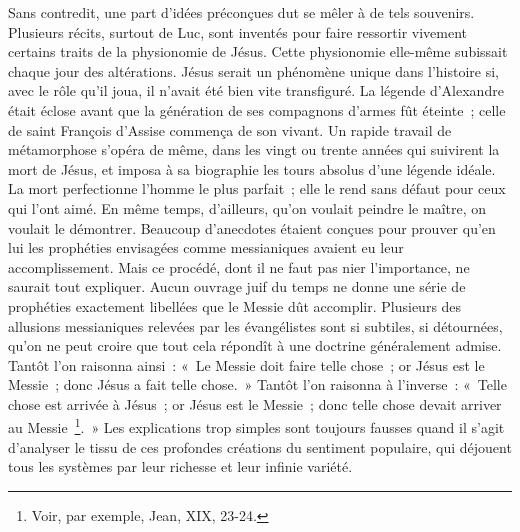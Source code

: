 \documentclass[french,twoside]{book} %
\begin{document}
Sans contredit, une part d’idées préconçues dut se mêler à de tels souvenirs. Plusieurs récits, surtout de Luc, sont inventés pour faire ressortir vivement certains traits de la physionomie de Jésus. Cette physionomie elle-même subissait chaque jour des altérations. Jésus serait un phénomène unique dans l’histoire si, avec le rôle qu’il joua, il n’avait été bien vite transfiguré. La légende d’Alexandre était éclose avant que la génération de ses compagnons d’armes fût éteinte ; celle de saint François d’Assise commença de son vivant. Un rapide travail de métamorphose s’opéra de même, dans les vingt ou trente années qui suivirent la mort de Jésus, et imposa à sa biographie les tours absolus d’une légende idéale. La mort perfectionne l’homme le plus parfait ; elle le rend sans défaut pour ceux qui l’ont aimé. En même temps, d’ailleurs, qu’on voulait peindre le maître, on voulait le démontrer. Beaucoup d’anecdotes étaient conçues pour prouver qu’en lui les prophéties envisagées comme messianiques avaient eu leur accomplissement. Mais ce procédé, dont il ne faut pas nier l’importance, ne saurait tout expliquer. Aucun ouvrage juif du temps ne donne une série de prophéties exactement libellées que le Messie dût accomplir. Plusieurs des allusions messianiques relevées par les évangélistes sont si subtiles, si détournées, qu’on ne peut croire que tout cela répondît à une doctrine généralement admise. Tantôt l’on raisonna ainsi : « Le Messie doit faire telle chose ; or Jésus est le Messie ; donc Jésus a fait telle chose. » Tantôt l’on raisonna à l’inverse : « Telle chose est arrivée à Jésus ; or Jésus est le Messie ; donc telle chose devait arriver au Messie \footnote{Voir, par exemple, Jean, XIX, 23-24.}. » Les explications trop simples sont toujours fausses quand il s’agit d’analyser le tissu de ces profondes créations du sentiment populaire, qui déjouent tous les systèmes par leur richesse et leur infinie variété.\par
\end{document}
